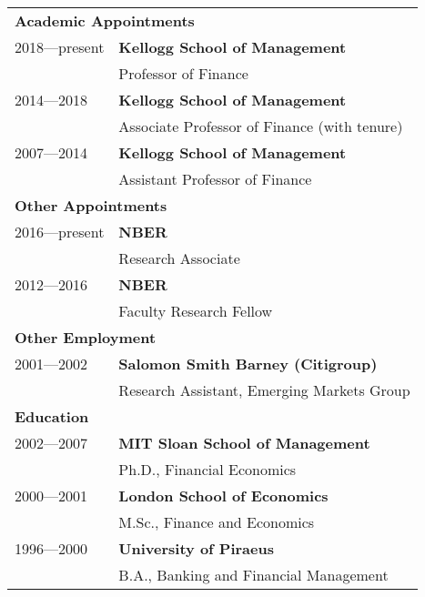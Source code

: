 \documentclass[12pt,letterpaper,serif,overlapped]{res}
\begin{document}
\begin{resume}
\begin{tabular}{ll}\\[1cm]
\multicolumn{2}{l}{\textbf{Academic Appointments}}\\
[0.5cm]
2018---present & \textbf{Kellogg School of Management}\\
& Professor of Finance\\
2014---2018 & \textbf{Kellogg School of Management}\\
& Associate Professor of Finance (with tenure)\\
 2007---2014 & \textbf{Kellogg School of Management}\\
& Assistant Professor of Finance\\
[0.75cm]
\multicolumn{2}{l}{\textbf{Other Appointments}}\\
[0.5cm]
2016---present & \textbf{NBER  }\\
& Research Associate\\[0.1cm]
2012---2016 & \textbf{NBER }\\
& Faculty Research Fellow\\
[0.75cm]
\multicolumn{2}{l}{\textbf{Other Employment}}\\
[0.5cm]
2001---2002 & \textbf{Salomon Smith Barney (Citigroup)}\\
& Research Assistant, Emerging Markets Group\\
[0.75cm]
\multicolumn{2}{l}{\textbf{Education}}\\
[0.5cm]
2002---2007 & \textbf{MIT Sloan School of Management}\\
& Ph.D., Financial Economics\\[0.1cm]
2000---2001 & \textbf{London School of Economics}\\
& M.Sc., Finance and Economics \\[0.1cm]
1996---2000 & \textbf{University of Piraeus} \\
& B.A., Banking and Financial Management\\
\end{tabular}







\newpage


\end{resume}
\end{document}
